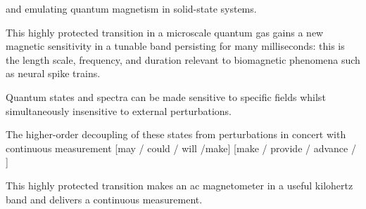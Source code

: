 and emulating quantum magnetism in solid-state systems.

This highly protected transition in a microscale quantum gas gains a new magnetic sensitivity in a tunable band persisting for many milliseconds: this is the length scale, frequency, and duration relevant to biomagnetic phenomena such as neural spike trains.

Quantum states and spectra can be made sensitive to specific fields whilst simultaneously insensitive to external perturbations.

The higher-order decoupling of these states from perturbations in concert with continuous measurement [may / could / will /make] [make / provide / advance / ]

This highly protected transition makes an ac magnetometer in a useful kilohertz band and delivers a continuous measurement.
